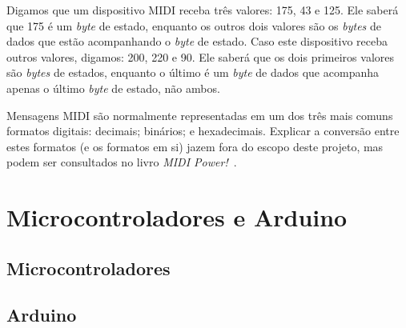             Digamos que um dispositivo MIDI receba três valores: 175, 43 e 125. Ele saberá que 175 é um \textit{byte} de estado, enquanto os outros dois valores são os \textit{bytes} de dados que estão acompanhando o \textit{byte} de estado. Caso este dispositivo receba outros valores, digamos: 200, 220 e 90. Ele saberá que os dois primeiros valores são \textit{bytes} de estados, enquanto o último é um \textit{byte} de dados que acompanha apenas o último \textit{byte} de estado, não ambos.

            Mensagens MIDI são normalmente representadas em um dos três mais comuns formatos digitais: decimais; binários; e hexadecimais. Explicar a conversão entre estes formatos (e os formatos em si) jazem fora do escopo deste projeto, mas podem ser consultados no livro \textit{MIDI Power!}~\cite{Guerin}.
            
            

    \section{Microcontroladores e Arduino}



        \subsection{Microcontroladores}



        \subsection{Arduino}

